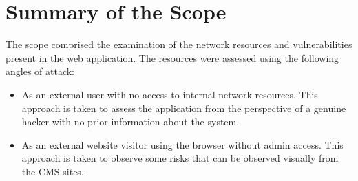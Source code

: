 \chapter{Summary of the Scope}
The scope comprised the examination of the network resources and vulnerabilities present in the web application. The resources were assessed using the following angles of attack:
\begin{itemize}
    \item As an external user with no access to internal network resources. This approach is taken to assess the application from the perspective of a genuine hacker with no prior information about the system.
    \item As an external website visitor using the browser without admin access. This approach is taken to observe some risks that can be observed visually from the CMS sites.
\end{itemize}

\begin{comment}
The testing was performed manually using a VM Kali Linux, and the tools installed, as the IP used for testing is not whitelisted; there is a possibility of getting blocked during the assessment.

\newline
\begin{table}[h!]
\centering
\begin{tabular}{||c| c||} 
 \hline
 CIDR BLOCK & IP  \\ [0.5ex] 
 \hline
 /32 & 68.66.247.187  \\
 \hline
\end{tabular}
\caption{IP block tested}
\label{table:1}
\end{table}

\end{comment}